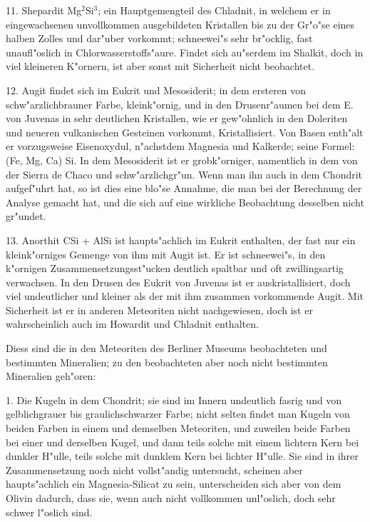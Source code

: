 \documentclass[a4paper, 11pt, oneside]{article}
\begin{document}
11. Shepardit Mg$^{2}$Si$^{3}$; ein Hauptgemengteil des Chladnit, in welchem er in eingewachsenen unvollkommen ausgebildeten Kristallen bis zu der Gr"o"se eines halben Zolles und dar"uber vorkommt; schneewei"s sehr br"ocklig, fast unaufl"oslich in Chlorwasserstoffs"aure. Findet sich au"serdem im Shalkit, doch in viel kleineren K"ornern, ist aber sonst mit Sicherheit nicht beobachtet.

12. Augit findet sich im Eukrit und Mesosiderit; in dem ersteren von schw"arzlichbrauner Farbe, kleink"ornig, und in den Drusenr"aumen bei dem E. von Juvenas in sehr deutlichen Kristallen, wie er gew"ohnlich in den Doleriten und neueren vulkanischen Gesteinen vorkommt, Kristallisiert. Von Basen enth"alt er vorzugsweise Eisenoxydul, n"achstdem Magnesia und Kalkerde; seine Formel: (Fe, Mg, Ca) Si. In dem Mesosiderit ist er grobk"orniger, namentlich in dem von der Sierra de Chaco und schw"arzlichgr"un. Wenn man ihn auch in dem Chondrit aufgef"uhrt hat, so ist dies eine blo"se Annahme, die man bei der Berechnung der Analyse gemacht hat, und die sich auf eine wirkliche Beobachtung desselben nicht gr"undet.

13. Anorthit CSi + AlSi ist haupts"achlich im Eukrit enthalten, der fast nur ein kleink"orniges Gemenge von ihm mit Augit ist. Er ist schneewei"s, in den k"ornigen Zusammensetzungsst"ucken deutlich spaltbar und oft zwillingsartig verwachsen. In den Drusen des Eukrit von Juvenas ist er auskristallisiert, doch viel undeutlicher und kleiner als der mit ihm zusammen vorkommende Augit. Mit Sicherheit ist er in anderen Meteoriten nicht nachgewiesen, doch ist er wahrscheinlich auch im Howardit und Chladnit enthalten.

Diess sind die in den Meteoriten des Berliner Museums beobachteten und bestimmten Mineralien; zu den beobachteten aber noch nicht bestimmten Mineralien geh"oren:

1. Die Kugeln in dem Chondrit; sie sind im Innern undeutlich fasrig und von gelblichgrauer bis graulichschwarzer Farbe; nicht selten findet man Kugeln von beiden Farben in einem und demselben Meteoriten, und zuweilen beide Farben bei einer und derselben Kugel, und dann teils solche mit einem lichtern Kern bei dunkler H"ulle, teils solche mit dunklem Kern bei lichter H"ulle. Sie sind in ihrer Zusammensetzung noch nicht vollst"andig untersucht, scheinen aber haupts"achlich ein Magnesia-Silicat zu sein, unterscheiden sich aber von dem Olivin dadurch, dass sie, wenn auch nicht vollkommen unl"oslich, doch sehr schwer l"oslich sind.
\end{document}
